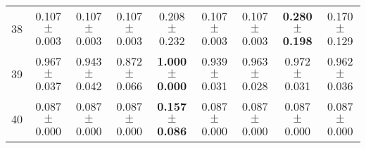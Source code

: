 \begin{table}[!ht]
{\begin{tabular}{r c c c c c c c c}
38 & 0.107 $\pm$ 0.003 & 0.107 $\pm$ 0.003 & 0.107 $\pm$ 0.003 & 0.208 $\pm$ 0.232 & 0.107 $\pm$ 0.003 & 0.107 $\pm$ 0.003 & \textbf{0.280 $\pm$ 0.198} & 0.170 $\pm$ 0.129 \\
39 & 0.967 $\pm$ 0.037 & 0.943 $\pm$ 0.042 & 0.872 $\pm$ 0.066 & \textbf{1.000 $\pm$ 0.000} & 0.939 $\pm$ 0.031 & 0.963 $\pm$ 0.028 & 0.972 $\pm$ 0.031 & 0.962 $\pm$ 0.036 \\
40 & 0.087 $\pm$ 0.000 & 0.087 $\pm$ 0.000 & 0.087 $\pm$ 0.000 & \textbf{0.157 $\pm$ 0.086} & 0.087 $\pm$ 0.000 & 0.087 $\pm$ 0.000 & 0.087 $\pm$ 0.000 & 0.087 $\pm$ 0.000 \\
\end{tabular}}
\end{table}
